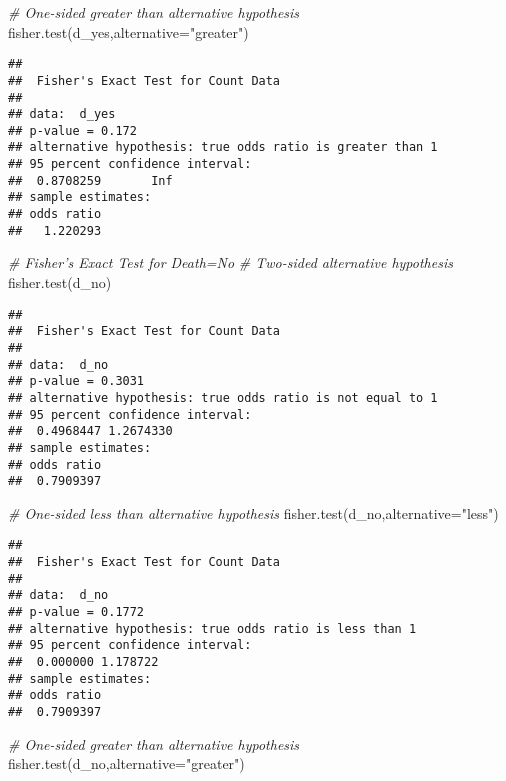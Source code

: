 \documentclass[
]{article}
\newenvironment{Shaded}{\begin{snugshade}}{\end{snugshade}}
\newcommand{\AttributeTok}[1]{\textcolor[rgb]{0.77,0.63,0.00}{#1}}
\newcommand{\CommentTok}[1]{\textcolor[rgb]{0.56,0.35,0.01}{\textit{#1}}}
\newcommand{\FunctionTok}[1]{\textcolor[rgb]{0.00,0.00,0.00}{#1}}
\newcommand{\NormalTok}[1]{#1}
\newcommand{\StringTok}[1]{\textcolor[rgb]{0.31,0.60,0.02}{#1}}
\begin{document}
\begin{Shaded}
\begin{Highlighting}[]
\CommentTok{\# One{-}sided greater than alternative hypothesis}
\FunctionTok{fisher.test}\NormalTok{(d\_yes,}\AttributeTok{alternative=}\StringTok{"greater"}\NormalTok{)}
\end{Highlighting}
\end{Shaded}

\begin{verbatim}
## 
##  Fisher's Exact Test for Count Data
## 
## data:  d_yes
## p-value = 0.172
## alternative hypothesis: true odds ratio is greater than 1
## 95 percent confidence interval:
##  0.8708259       Inf
## sample estimates:
## odds ratio 
##   1.220293
\end{verbatim}

\begin{Shaded}
\begin{Highlighting}[]
\CommentTok{\# Fisher’s Exact Test for Death=No}
\CommentTok{\# Two{-}sided alternative hypothesis}
\FunctionTok{fisher.test}\NormalTok{(d\_no)}
\end{Highlighting}
\end{Shaded}

\begin{verbatim}
## 
##  Fisher's Exact Test for Count Data
## 
## data:  d_no
## p-value = 0.3031
## alternative hypothesis: true odds ratio is not equal to 1
## 95 percent confidence interval:
##  0.4968447 1.2674330
## sample estimates:
## odds ratio 
##  0.7909397
\end{verbatim}

\begin{Shaded}
\begin{Highlighting}[]
\CommentTok{\# One{-}sided less than alternative hypothesis}
\FunctionTok{fisher.test}\NormalTok{(d\_no,}\AttributeTok{alternative=}\StringTok{"less"}\NormalTok{)}
\end{Highlighting}
\end{Shaded}

\begin{verbatim}
## 
##  Fisher's Exact Test for Count Data
## 
## data:  d_no
## p-value = 0.1772
## alternative hypothesis: true odds ratio is less than 1
## 95 percent confidence interval:
##  0.000000 1.178722
## sample estimates:
## odds ratio 
##  0.7909397
\end{verbatim}

\begin{Shaded}
\begin{Highlighting}[]
\CommentTok{\# One{-}sided greater than alternative hypothesis}
\FunctionTok{fisher.test}\NormalTok{(d\_no,}\AttributeTok{alternative=}\StringTok{"greater"}\NormalTok{)}
\end{Highlighting}
\end{Shaded}
\end{document}

